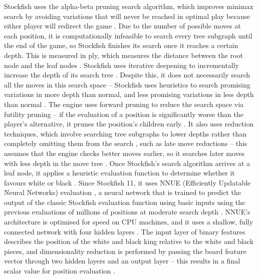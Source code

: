 \documentclass[%
 superscriptaddress,
showpacs,preprintnumbers,
 amsmath,
 amssymb,
 aps,
 pra,
showkeys,
onecolumn,
notitlepage,
11pt,
tightenlines      %
]{revtex4-1}
\begin{document}
Stockfish uses the alpha-beta pruning search algorithm, which improves minimax search \cite{v1928theorie} by avoiding variations that will never be reached in optimal play because either player will redirect the game \cite{maharaj2022chess}. Due to the number of possible moves at each position, it is computationally infeasible to search every tree subgraph until the end of the game, so Stockfish finishes its search once it reaches a certain depth. This is measured in ply, which measures the distance between the root node and the leaf nodes \cite{maharaj2022chess}. Stockfish uses iterative deepening to incrementally increase the depth of its search tree \cite{de2014thought}. Despite this, it does not necessarily search all the moves in this search space -- Stockfish uses heuristics to search promising variations in more depth than normal, and less promising variations in less depth than normal \cite{maharaj2022chess}. The engine uses forward pruning to reduce the search space via futility pruning -- if the evaluation of a position is significantly worse than the player's alternative, it prunes the position's children early \cite{maharaj2022chess}. It also uses reduction techniques, which involve searching tree subgraphs to lower depths rather than completely omitting them from the search \cite{maharaj2022chess}, such as late move reductions -- this assumes that the engine checks better moves earlier, so it searches later moves with less depth in the move tree \cite{levy1989sex}. Once Stockfish's search algorithm arrives at a leaf node, it applies a heuristic evaluation function to determine whether it favours white or black \cite{maharaj2022chess}. Since Stockfish 11, it uses NNUE (Efficiently Updatable Neural Networks) evaluation \cite{nasu2018efficiently}, a neural network that is trained to predict the output of the classic Stockfish evaluation function using basic inputs using the previous evaluations of millions of positions at moderate search depth \cite{stockfishNNUEEvaluation}. NNUE's architecture is optimised for speed on CPU machines, and it uses a shallow, fully connected network with four hidden layers \cite{guideToStockfishNNUE}. The input layer of binary features describes the position of the white and black king relative to the white and black pieces, and dimensionality reduction is performed by passing the board feature vector through two hidden layers and an output layer -- this results in a final scalar value for position evaluation \cite{maharaj2022chess}.
\end{document}
